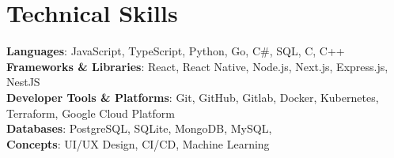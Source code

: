 \documentclass[a4paper,11pt]{article}
\begin{document}
\section{Technical Skills}
 \begin{itemize}[leftmargin=0.15in, label={}]
    \small{\item{
     \textbf{Languages}{: JavaScript, TypeScript, Python, Go, C\#, SQL, C, C++} \\
     \textbf{Frameworks \& Libraries}{: React, React Native, Node.js, Next.js, Express.js, NestJS} \\
     \textbf{Developer Tools \& Platforms}{: Git, GitHub, Gitlab, Docker, Kubernetes, Terraform, Google Cloud Platform} \\
     \textbf{Databases}{: PostgreSQL, SQLite, MongoDB, MySQL, } \\
     \textbf{Concepts}{: UI/UX Design, CI/CD, Machine Learning}
    }}
 \end{itemize}
 \vspace{-16pt}

\end{document}
